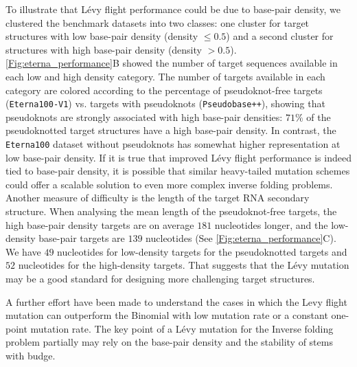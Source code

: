 To illustrate that Lévy flight performance could be due to base-pair density, we clustered the benchmark datasets into two classes: one cluster for target structures with low base-pair density (density $\leq 0.5$) and a second cluster for structures with high base-pair density (density $> 0.5$). \autoref{Fig:eterna_performance}B showed the number of target sequences available in each low and high density category. The number of targets available in each category are colored according to the percentage of pseudoknot-free targets (\texttt{Eterna100-V1}) vs. targets with pseudoknots (\texttt{Pseudobase++}), showing that pseudoknots are strongly associated with high base-pair densities: $71\%$ of the pseudoknotted target structures have a high base-pair density.  In contrast, the \texttt{Eterna100} dataset without pseudoknots has somewhat higher representation at low base-pair density. If it is true that improved Lévy flight performance is indeed tied to base-pair density, it is possible that similar heavy-tailed mutation schemes could offer a scalable solution to even more complex inverse folding problems. Another measure of difficulty is the length of the target \ac{RNA} secondary structure. When analysing the mean length of the pseudoknot-free targets, the high base-pair density targets are on average $181$ nucleotides longer, and the low-density base-pair targets are $139$ nucleotides (See \autoref{Fig:eterna_performance}C). We have $49$ nucleotides for low-density targets for the pseudoknotted targets and $52$ nucleotides for the high-density targets. That suggests that the Lévy mutation may be a good standard for designing more challenging target structures.

A further effort have been made to understand the cases in which the Levy flight mutation can outperform the Binomial with low mutation rate or a constant one-point mutation rate. The key point of a Lévy mutation for the Inverse folding problem partially may rely on the base-pair density and the stability of stems with budge.  


